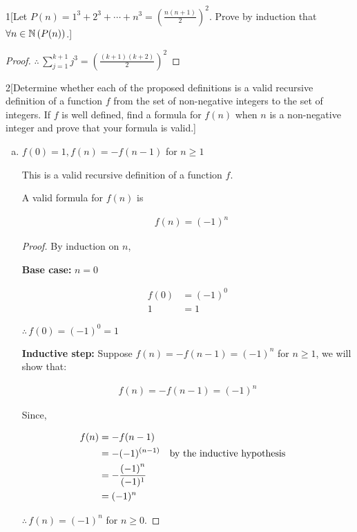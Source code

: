 \documentclass{homework}
\begin{document}
\begin{problem}{1}[Let $P(n ) = 1^3 + 2^3 + \cdots + n^3 = \left(\frac{n(n+1)}{2}\right)^2$. Prove by induction that $\forall n \in \N \, (P(n))$.]
\begin{proof}
$\therefore \, \sum_{j=1}^{k+1} j^3 = \left( \frac{(k+1)(k+2)}{2} \right)^2$
\end{proof}
\end{problem}



\begin{problem}{2}[Determine whether each of the proposed definitions is a valid recursive definition of a function $f$ from the set of non-negative integers to the set of integers. If $f$ is well defined, find a formula for $f(n)$ when $n$ is a non-negative integer and prove that your formula is valid.]

\begin{enumerate}[(a)]


\item $f(0) = 1, f(n) = -f(n - 1)$ for $n \geq 1$

This is a valid recursive definition of a function $f$.

A valid formula for $f(n)$ is

\begin{align*}
& f(n) = (-1)^n
\end{align*}

\begin{proof}
By induction on $n$,

\textbf{Base case:} $n = 0$

\begin{align*}
f(0) &= (-1)^0 \\
1 &= 1
\end{align*}

$\therefore \, f(0) = (-1)^0 = 1$

\textbf{Inductive step:} Suppose $f(n) = -f(n - 1) = \left(-1\right)^n$ for $n \geq 1$, we will show that:

\begin{align*}
f(n) = -f(n - 1) = {(-1)}^n
\end{align*}

Since,

\begin{align*}
f(n) &= -f(n - 1) \\
&= -(-1)^{(n-1)} && \tt{by the inductive hypothesis} \\
&= -\frac{{(-1)}^n}{(-1)^1} \\
&= (-1)^n
\end{align*}

$\therefore \, f(n) = \left(-1\right)^n $ for $n \geq 0$.
\end{proof}



\end{enumerate}
\end{problem}
\end{document}
